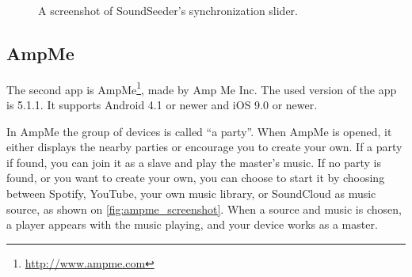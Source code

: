 \begin{figure}[h!]
\begin{minipage}[b]{0.45\textwidth}
        \caption{A screenshot of SoundSeeder's synchronization slider.}\label{fig:soundseeder_slider}
    \end{minipage}
\end{figure}

\subsection{AmpMe}\label{subsec:ampme}
The second app is AmpMe\footnote{\url{http://www.ampme.com}}, made by Amp Me Inc.
The used version of the app is 5.1.1.
It supports Android 4.1 or newer and iOS 9.0 or newer.

In AmpMe the group of devices is called ``a party''.
When AmpMe is opened, it either displays the nearby parties or encourage you to create your own. 
If a party if found, you can join it as a slave and play the master's music.
If no party is found, or you want to create your own, you can choose to start it by choosing between Spotify, 
YouTube, your own music library, or SoundCloud as music source, as shown on \cref{fig:ampme_screenshot}. 
When a source and music is chosen, a player appears with the music playing,
and your device works as a master.

